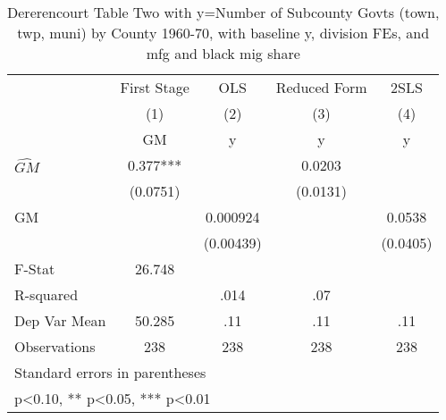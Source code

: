 \begin{table}[htbp]\centering
\def\sym#1{\ifmmode^{#1}\else\(^{#1}\)\fi}
\caption{Dererencourt Table Two with y=Number of Subcounty Govts (town, twp, muni) by County 1960-70, with baseline y, division FEs, and mfg and black mig share}
\begin{tabular}{l*{4}{c}}
\toprule
                    & First Stage   &         OLS   &Reduced Form   &        2SLS   \\
                    &\multicolumn{1}{c}{(1)}&\multicolumn{1}{c}{(2)}&\multicolumn{1}{c}{(3)}&\multicolumn{1}{c}{(4)}\\
                    &\multicolumn{1}{c}{GM}&\multicolumn{1}{c}{y}&\multicolumn{1}{c}{y}&\multicolumn{1}{c}{y}\\
\midrule
$\hat{GM}$          &       0.377***&               &      0.0203   &               \\
                    &    (0.0751)   &               &    (0.0131)   &               \\
\addlinespace
GM                  &               &    0.000924   &               &      0.0538   \\
                    &               &   (0.00439)   &               &    (0.0405)   \\
\midrule
F-Stat              &      26.748   &               &               &               \\
R-squared           &               &        .014   &         .07   &               \\
Dep Var Mean        &      50.285   &         .11   &         .11   &         .11   \\
Observations        &         238   &         238   &         238   &         238   \\
\bottomrule
\multicolumn{5}{l}{\footnotesize Standard errors in parentheses}\\
\multicolumn{5}{l}{\footnotesize * p<0.10, ** p<0.05, *** p<0.01}\\
\end{tabular}
\end{table}

